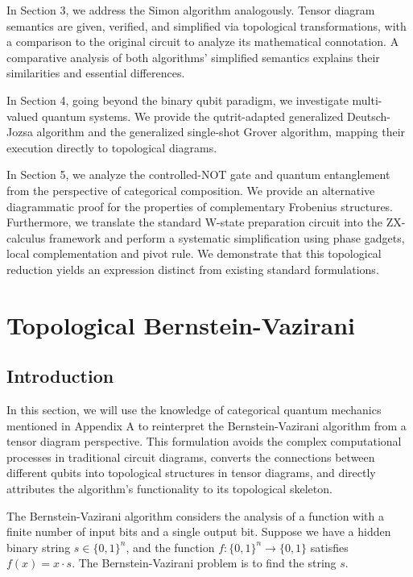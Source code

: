\documentclass[a4paper,twocolumn,11pt,unpublished]{quantumarticle}
\numberwithin{equation}{section}
\begin{document}
In Section 3, we address the Simon algorithm analogously. Tensor diagram semantics are given, verified, and simplified via topological transformations, with a comparison to the original circuit to analyze its mathematical connotation. A comparative analysis of both algorithms' simplified semantics explains their similarities and essential differences.

In Section 4, going beyond the binary qubit paradigm, we investigate multi-valued quantum systems. We provide the qutrit-adapted generalized Deutsch-Jozsa algorithm and the generalized single-shot Grover algorithm, mapping their execution directly to topological diagrams.

In Section 5, we analyze the controlled-NOT gate and quantum entanglement from the perspective of categorical composition. We provide an alternative diagrammatic proof for the properties of complementary Frobenius structures. Furthermore, we translate the standard W-state preparation circuit into the ZX-calculus framework and perform a systematic simplification using phase gadgets, local complementation and pivot rule. We demonstrate that this topological reduction yields an expression distinct from existing standard formulations.

\section{Topological Bernstein-Vazirani}\label{pre}
\subsection{Introduction}
In this section, we will use the knowledge of categorical quantum mechanics mentioned in Appendix A to reinterpret the Bernstein-Vazirani algorithm from a tensor diagram perspective. This formulation avoids the complex computational processes in traditional circuit diagrams, converts the connections between different qubits into topological structures in tensor diagrams, and directly attributes the algorithm's functionality to its topological skeleton.

The Bernstein-Vazirani algorithm considers the analysis of a function with a finite number of input bits and a single output bit. Suppose we have a hidden binary string $s\in \{0, 1\}^{n}$, and the function $f: \{0, 1\}^{n} \rightarrow \{0, 1\}$ satisfies $f(x)=x \cdot s$. The Bernstein-Vazirani problem is to find the string $s$.
\end{document}
